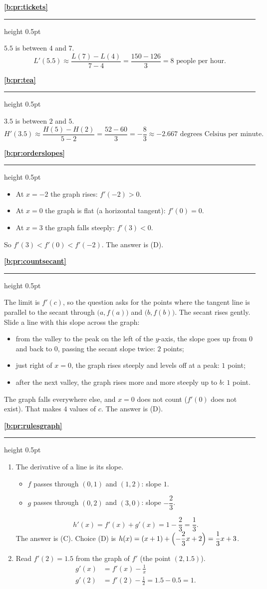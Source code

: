 \documentclass[11pt,a4paper]{article}
\newcommand{\solitem}[2]{%
 \par\addvspace{16pt}\Needspace{10\baselineskip}%
 {\large\bfseries \ref{#1}}\par\nobreak\vspace{2pt}%
 {\color{rulegray}\hrule height 0.5pt}\nobreak\vspace{7pt}%
 #2\par}
\begin{document}
\solitem{b:pr:tickets}{%
$5.5$ is between $4$ and $7$.
\[
L'(5.5)\approx\frac{L(7)-L(4)}{7-4}=\frac{150-126}{3}=8\text{ people per hour.}
\]
}

\solitem{b:pr:tea}{%
$3.5$ is between $2$ and $5$.
\[
H'(3.5)\approx\frac{H(5)-H(2)}{5-2}=\frac{52-60}{3}=-\frac83\approx-2.667\text{ degrees Celsius per minute.}
\]
}

\solitem{b:pr:orderslopes}{%
\begin{itemize}
 \item At $x=-2$ the graph rises: $f'(-2)>0$.
 \item At $x=0$ the graph is flat (a horizontal tangent): $f'(0)=0$.
 \item At $x=3$ the graph falls steeply: $f'(3)<0$.
\end{itemize}
So $f'(3)<f'(0)<f'(-2)$. The answer is (D).
}

\solitem{b:pr:countsecant}{%
The limit is $f'(c)$, so the question asks for the points where the tangent line is parallel to the secant through $\bigl(a,f(a)\bigr)$ and $\bigl(b,f(b)\bigr)$. The secant rises gently. Slide a line with this slope across the graph:
\begin{itemize}
 \item from the valley to the peak on the left of the $y$-axis, the slope goes up from $0$ and back to $0$, passing the secant slope twice: $2$ points;
 \item just right of $x=0$, the graph rises steeply and levels off at a peak: $1$ point;
 \item after the next valley, the graph rises more and more steeply up to $b$: $1$ point.
\end{itemize}
The graph falls everywhere else, and $x=0$ does not count ($f'(0)$ does not exist). That makes $4$ values of $c$. The answer is (D).
}

\solitem{b:pr:rulesgraph}{%
\begin{enumerate}[label=(\alph*)]
 \item The derivative of a line is its slope.
 \begin{itemize}
  \item $f$ passes through $(0,1)$ and $(1,2)$: slope $1$.
  \item $g$ passes through $(0,2)$ and $(3,0)$: slope $-\dfrac23$.
 \end{itemize}
 \[
 h'(x)=f'(x)+g'(x)=1-\frac23=\frac13.
 \]
 The answer is (C). Choice (D) is $h(x)=(x+1)+\Bigl(-\dfrac23x+2\Bigr)=\dfrac13x+3$.
 \item Read $f'(2)=1.5$ from the graph of $f'$ (the point $(2,1.5)$).
 \begin{align*}
 g'(x)&=f'(x)-\frac1x\\
 g'(2)&=f'(2)-\frac12=1.5-0.5=1.
 \end{align*}
\end{enumerate}
}
\end{document}
